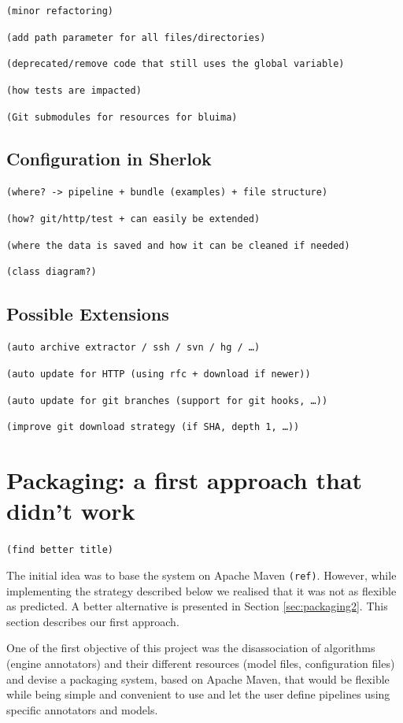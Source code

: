 \documentclass{article}
\newcommand{\TODO}[1]{\texttt{\textcolor{YellowOrange}{(#1)}}} %
\begin{document}
\TODO{minor refactoring}

\TODO{add path parameter for all files/directories}

\TODO{deprecated/remove code that still uses the global variable}

\TODO{how tests are impacted}

\TODO{Git submodules for resources for bluima}

\subsection{Configuration in Sherlok}

\TODO{where? -> pipeline + bundle (examples) + file structure}

\TODO{how? git/http/test + can easily be extended}

\TODO{where the data is saved and how it can be cleaned if needed}

\TODO{class diagram?}

\subsection{Possible Extensions}

\TODO{auto archive extractor / ssh / svn / hg / \dots}

\TODO{auto update for HTTP (using rfc + download if newer)}

\TODO{auto update for git branches (support for git hooks, \dots)}

\TODO{improve git download strategy (if SHA, depth 1, \dots)}

\section{Packaging: a first approach that didn't work}
\label{sec:packaging1}

\TODO{find better title}

The initial idea was to base the system on Apache Maven \TODO{ref}. However, while implementing the strategy described below we realised that it was not as flexible as predicted. A better alternative is presented in Section \ref{sec:packaging2}. This section describes our first approach.

One of the first objective of this project was the disassociation of algorithms (engine annotators) and their different resources (model files, configuration files) and devise a packaging system, based on Apache Maven, that would be flexible while being simple and convenient to use and let the user define pipelines using specific annotators and models.
\end{document}
